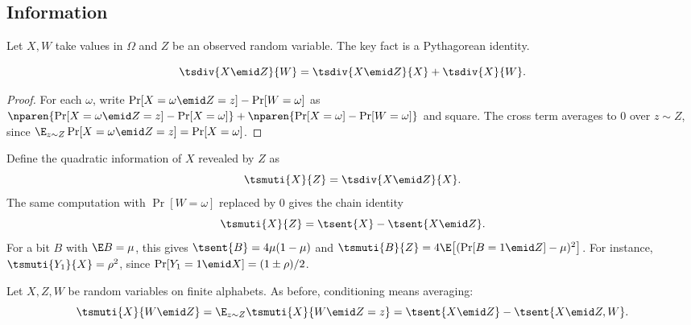 \subsection*{Information}
Let $X,W$ take values in $\Omega$ and $Z$ be an observed random
variable. The key fact is a Pythagorean identity.
\begin{lemma}
\label{lem:quad-pythagoras}
\begin{equation*}
  \tsdiv{X\emid Z}{W}=\tsdiv{X\emid Z}{X}+\tsdiv{X}{W}.
\end{equation*}
\end{lemma}
\begin{proof}
For each $\omega$, write $\Pr[X=\omega\emid Z=z]-\Pr[W=\omega]$ as
$\nparen{\Pr[X=\omega\emid Z=z]-\Pr[X=\omega]}
+\nparen{\Pr[X=\omega]-\Pr[W=\omega]}$ and square. The cross term
averages to $0$ over $z\sim Z$, since
$\E_{z\sim Z}\Pr[X=\omega\emid Z=z]=\Pr[X=\omega]$.
\end{proof}
Define the quadratic information of $X$ revealed by $Z$ as
\begin{equation*}
  \tsmuti{X}{Z}=\tsdiv{X\emid Z}{X}.
\end{equation*}
The same computation with $\Pr[W=\omega]$ replaced by $0$ gives
the chain identity
\begin{equation}
  \label{eq:quad-chain}
  \tsmuti{X}{Z}=\tsent{X}-\tsent{X\emid Z}.
\end{equation}
For a bit $B$ with $\E B=\mu$, this gives
$\tsent{B}=4\mu(1-\mu)$ and
$\tsmuti{B}{Z}=4\E\bigl[(\Pr[B=1\emid Z]-\mu)^2\bigr]$.
For instance, $\tsmuti{Y_1}{X}=\rho^2$, since
$\Pr[Y_1=1\emid X]=(1\pm\rho)/2$.

Let $X,Z,W$ be random variables on finite alphabets.
As before, conditioning means averaging:
\begin{equation*}
  \tsmuti{X}{W\emid Z}=\E_{z\sim Z}\tsmuti{X}{W\emid Z=z}
  =\tsent{X\emid Z}-\tsent{X\emid Z,W}.
\end{equation*}

